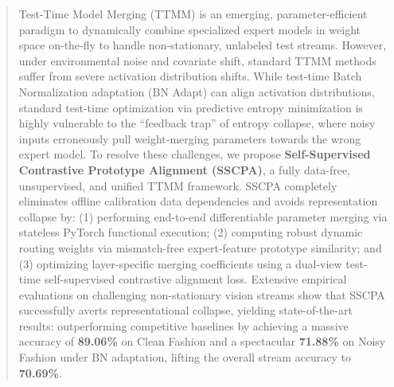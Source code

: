 \documentclass{article}
\theoremstyle{plain}
\theoremstyle{definition}
\theoremstyle{remark}
\begin{document}

\printAffiliationsAndNotice{}

\begin{abstract}
Test-Time Model Merging (TTMM) is an emerging, parameter-efficient paradigm to dynamically combine specialized expert models in weight space on-the-fly to handle non-stationary, unlabeled test streams. However, under environmental noise and covariate shift, standard TTMM methods suffer from severe activation distribution shifts. While test-time Batch Normalization adaptation (BN Adapt) can align activation distributions, standard test-time optimization via predictive entropy minimization is highly vulnerable to the ``feedback trap'' of entropy collapse, where noisy inputs erroneously pull weight-merging parameters towards the wrong expert model. To resolve these challenges, we propose \textbf{Self-Supervised Contrastive Prototype Alignment (SSCPA)}, a fully data-free, unsupervised, and unified TTMM framework. SSCPA completely eliminates offline calibration data dependencies and avoids representation collapse by: (1) performing end-to-end differentiable parameter merging via stateless PyTorch functional execution; (2) computing robust dynamic routing weights via mismatch-free expert-feature prototype similarity; and (3) optimizing layer-specific merging coefficients using a dual-view test-time self-supervised contrastive alignment loss. Extensive empirical evaluations on challenging non-stationary vision streams show that SSCPA successfully averts representational collapse, yielding state-of-the-art results: outperforming competitive baselines by achieving a massive accuracy of \textbf{89.06\%} on Clean Fashion and a spectacular \textbf{71.88\%} on Noisy Fashion under BN adaptation, lifting the overall stream accuracy to \textbf{70.69\%}.
\end{abstract}
\end{document}

